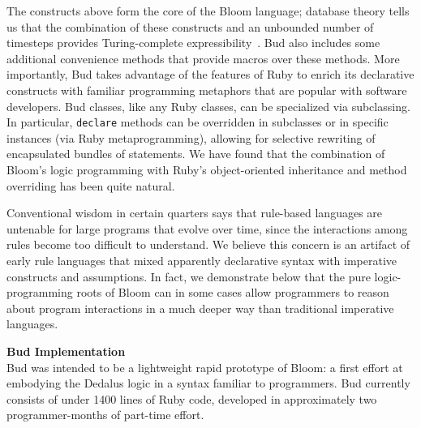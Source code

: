 The constructs above form the core of the Bloom language; database theory tells us that the combination of these constructs and an unbounded number of timesteps provides Turing-complete expressibility~\cite{Papadimitriou85}.  
Bud also includes some additional convenience methods that provide macros over these methods.  More importantly, Bud takes advantage of the features of Ruby to enrich its declarative constructs with familiar programming metaphors that are popular with software developers.  Bud classes, like any Ruby classes, can be specialized via subclassing.  In particular, \texttt{declare} methods can be overridden in subclasses or in specific instances (via Ruby metaprogramming), allowing for selective rewriting of encapsulated bundles of statements.  We have found that the combination of Bloom's logic programming with Ruby's object-oriented inheritance and method overriding has been quite natural.

Conventional wisdom in certain quarters says that rule-based languages are untenable for large programs that evolve over time, since the interactions among rules become too difficult to understand.  We believe this concern is an artifact of early rule languages that mixed apparently declarative syntax with imperative constructs and assumptions.  In fact, we demonstrate below that the pure logic-programming roots of Bloom can in some cases allow programmers to reason about program interactions in a much deeper way than traditional imperative languages.

\textbf{Bud Implementation}\\
Bud was intended to be a lightweight rapid prototype of Bloom: a first effort at embodying the Dedalus logic in a syntax familiar to programmers.  Bud currently consists of under 1400 lines of Ruby code, developed in approximately two programmer-months of part-time effort.

